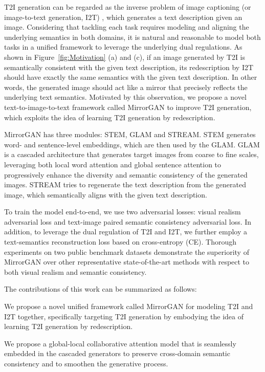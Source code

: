 \documentclass[10pt,twocolumn,letterpaper]{article}
\begin{document}
T2I generation can be regarded as the inverse problem of image captioning (or image-to-text generation, I2T) \cite{xu2015show,vinyals2015show,karpathy2015deep}, which generates a text description given an image. Considering that tackling each task requires modeling and aligning the underlying semantics in both domains, it is natural and reasonable to model both tasks in a unified framework to leverage the underlying dual regulations. As shown in Figure~\ref{fig:Motivation} (a) and (c), if an image generated by T2I is semantically consistent with the given text description, its redescription by I2T should have exactly the same semantics with the given text description. In other words, the generated image should act like a mirror that precisely reflects the underlying text semantics. Motivated by this observation, we propose a novel text-to-image-to-text framework called MirrorGAN to improve T2I generation, which exploits the idea of learning T2I generation by redescription.

MirrorGAN has three modules: STEM, GLAM and STREAM. STEM generates word- and sentence-level embeddings, which are then used by the GLAM. GLAM is a cascaded architecture that generates target images from coarse to fine scales, leveraging both local word attention and global sentence attention to progressively enhance the diversity and semantic consistency of the generated images. STREAM tries to regenerate the text description from the generated image, which semantically aligns with the given text description. 

To train the model end-to-end, we use two adversarial losses: visual realism adversarial loss and text-image paired semantic consistency adversarial loss. In addition, to leverage the dual regulation of T2I and I2T, we further employ a text-semantics reconstruction loss based on cross-entropy (CE). Thorough experiments on two public benchmark datasets demonstrate the superiority of MirrorGAN over other representative state-of-the-art methods with respect to both visual realism and semantic consistency.

The contributions of this work can be summarized as follows:

 We propose a novel unified framework called MirrorGAN for modeling T2I and I2T together, specifically targeting T2I generation by embodying the idea of learning T2I generation by redescription.

 We propose a global-local collaborative attention model that is seamlessly embedded in the cascaded generators to preserve cross-domain semantic consistency and to smoothen the generative process.
\end{document}
